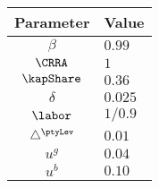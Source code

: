 \begin{center}
\begin{tabular}{c|l}
\hline
\multicolumn{1}{l|}{Parameter} & Value \\ \hline
\multicolumn{1}{c|}{$\beta $} & $0.99$ \\
\multicolumn{1}{c|}{$\CRRA $} & $1$ \\
\multicolumn{1}{c|}{$\kapShare $} & $0.36$ \\
\multicolumn{1}{c|}{$\delta $} & $0.025$ \\
\multicolumn{1}{c|}{$\labor$} & $1/0.9$ \\
\multicolumn{1}{c|}{$\bigtriangleup ^{\ptyLev}$} & $0.01$ \\
\multicolumn{1}{c|}{$u^{g}$} & $0.04$ \\
\multicolumn{1}{c|}{$u^{b}$} & $0.10$ \\ \hline
\end{tabular}
\end{center}

